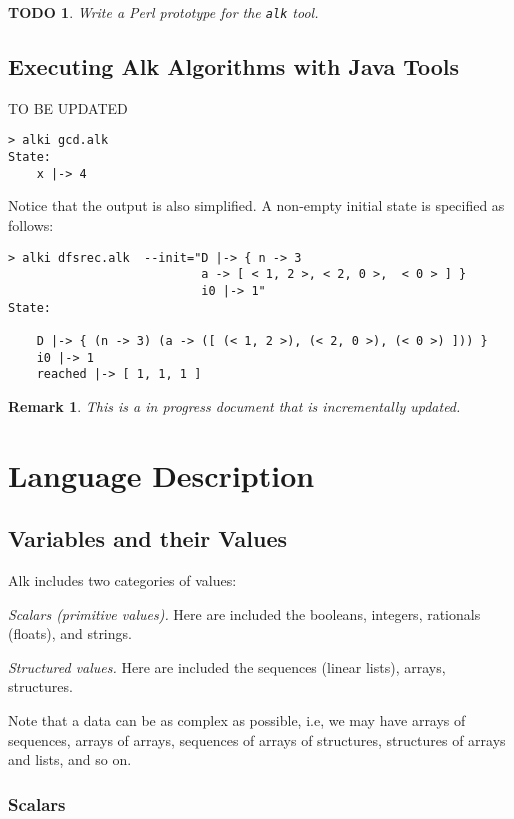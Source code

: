 \documentclass[a4paper]{report}
\newtheorem*{remark}{Remark}
\newtheorem*{todo}{TODO}
\begin{document}
\begin{todo}
Write a Perl prototype for the {\tt alk} tool.
\end{todo}

\section{Executing Alk Algorithms with Java Tools}

TO BE UPDATED

\begin{verbatim}
> alki gcd.alk 
State:
    x |-> 4
\end{verbatim}
Notice that the output is also simplified. A non-empty initial state is specified as follows:
\begin{verbatim}
> alki dfsrec.alk  --init="D |-> { n -> 3
                           a -> [ < 1, 2 >, < 2, 0 >,  < 0 > ] }
                           i0 |-> 1"
State:

    D |-> { (n -> 3) (a -> ([ (< 1, 2 >), (< 2, 0 >), (< 0 >) ])) }
    i0 |-> 1
    reached |-> [ 1, 1, 1 ]
\end{verbatim}

\begin{remark}
This is a in progress document that is incrementally updated.
\end{remark}

\chapter{Language Description}

\section{Variables and their Values}

Alk includes two categories of values:
\begin{list}{}{3ex}
\item[\it Scalars (primitive values).] Here are included the booleans, integers, rationals (floats), and strings. 
\item[\it Structured values.] Here are included the  sequences (linear lists), arrays, structures. 
\end{list} 
Note that a data can be as complex as possible, i.e, we may have arrays of sequences, arrays of arrays, sequences of arrays of structures, structures of arrays and lists, and so on.

\subsection{Scalars}
\end{document}
